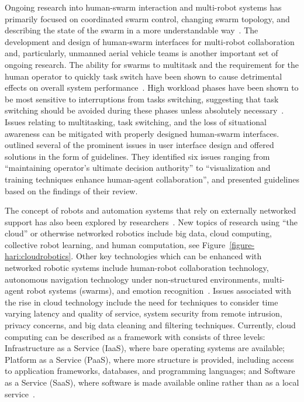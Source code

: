 Ongoing research into human-swarm interaction and multi-robot systems has primarily focused on coordinated swarm control, changing swarm topology, and describing the state of the swarm in a more understandable way~\citep{wang_current_2018}.
The development and design of human-swarm interfaces for multi-robot collaboration and, particularly, unmanned aerial vehicle teams is another important set of ongoing research.
The ability for swarms to multitask and the requirement for the human operator to quickly task switch have been shown to cause detrimental effects on overall system performance~\citep{chen_humanagent_2014}.
High workload phases have been shown to be most sensitive to interruptions from tasks switching, suggesting that task switching should be avoided during these phases unless absolutely necessary~\citep{norman_user_1986}.
Issues relating to multitasking, task switching, and the loss of situational awareness can be mitigated with properly designed human-swarm interfaces.
\citeauthor{chen_humanagent_2014} outlined several of the prominent issues in user interface design and offered solutions in the form of guidelines.
They identified six issues ranging from ``maintaining operator's ultimate decision authority'' to ``visualization and training techniques enhance human-agent collaboration'', and presented guidelines based on the findings of their review.

The concept of robots and automation systems that rely on externally networked support has also been explored by researchers~\citep{kehoe_survey_2015}.
New topics of research using ``the cloud'' or otherwise networked robotics include big data, cloud computing, collective robot learning, and human computation, see Figure~\ref{figure-hari:cloudrobotics}.
Other key technologies which can be enhanced with networked robotic systems include human-robot collaboration technology, autonomous navigation technology under non-structured environments, multi-agent robot systems (swarms), and emotion recognition~\citep{wang_current_2018}.
Issues associated with the rise in cloud technology include the need for techniques to consider time varying latency and quality of service, system security from remote intrusion, privacy concerns, and big data cleaning and filtering techniques.
Currently, cloud computing can be described as a framework with consists of three levels: Infrastructure as a Service (IaaS), where bare operating systems are available; Platform as a Service (PaaS), where more structure is provided, including access to application frameworks, databases, and programming languages; and Software as a Service (SaaS), where software is made available online rather than as a local service~\citep{kehoe_survey_2015}.

